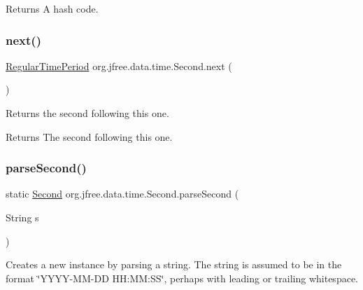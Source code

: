 \begin{DoxyReturn}{Returns}
A hash code. 
\end{DoxyReturn}
\mbox{\label{classorg_1_1jfree_1_1data_1_1time_1_1_second_ade3e235ac314c3c9ced69119bf3da2f1}} 
\subsubsection{\texorpdfstring{next()}{next()}}
{\footnotesize\ttfamily \mbox{\hyperlink{classorg_1_1jfree_1_1data_1_1time_1_1_regular_time_period}{Regular\+Time\+Period}} org.\+jfree.\+data.\+time.\+Second.\+next (\begin{DoxyParamCaption}{ }\end{DoxyParamCaption})}

Returns the second following this one.

\begin{DoxyReturn}{Returns}
The second following this one. 
\end{DoxyReturn}
\mbox{\label{classorg_1_1jfree_1_1data_1_1time_1_1_second_af670b6c42df856b28d97b1f49d74a999}} 
\subsubsection{\texorpdfstring{parse\+Second()}{parseSecond()}}
{\footnotesize\ttfamily static \mbox{\hyperlink{classorg_1_1jfree_1_1data_1_1time_1_1_second}{Second}} org.\+jfree.\+data.\+time.\+Second.\+parse\+Second (\begin{DoxyParamCaption}\item[{String}]{s }\end{DoxyParamCaption})\hspace{0.3cm}{\ttfamily [static]}}

Creates a new instance by parsing a string. The string is assumed to be in the format \char`\"{}\+Y\+Y\+Y\+Y-\/\+M\+M-\/\+D\+D H\+H\+:\+M\+M\+:\+S\+S\char`\"{}, perhaps with leading or trailing whitespace.


